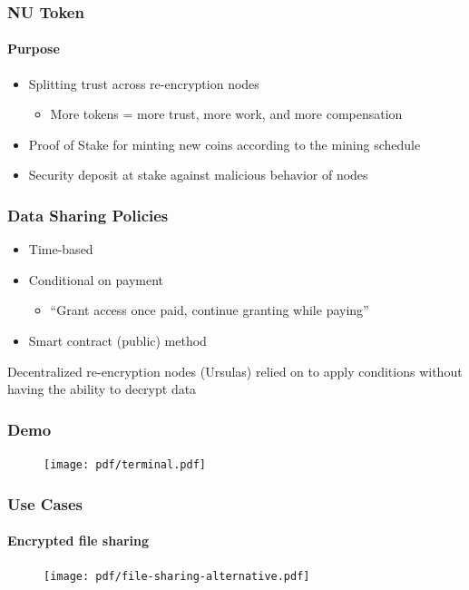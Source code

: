 \documentclass[xetex,mathsans,sans,aspectratio=169]{beamer}
\begin{document}
    \begin{frame}
        \frametitle{NU Token}
        \framesubtitle{Purpose}
        \begin{itemize}
            \setlength\itemsep{1em}
            \item Splitting trust across re-encryption nodes 
            \begin{itemize}
              \item More tokens = more trust, more work, and more compensation
            \end{itemize}
            \item Proof of Stake for minting new coins according to the mining schedule
            \item Security deposit at stake against malicious behavior of nodes
        \end{itemize}
    \end{frame}

   \begin{frame}
        \frametitle{Data Sharing Policies}
        \begin{itemize}
            \setlength\itemsep{1em}
            \item Time-based
            \item Conditional on payment 
            \begin{itemize}
              \item ``Grant access once paid, continue granting while paying''
            \end{itemize}
            \item Smart contract (public) method
        \end{itemize}
        \bigskip
        Decentralized re-encryption nodes (Ursulas) relied on to apply conditions without having the ability to decrypt data
    \end{frame}

    \begin{frame}
        \frametitle{Demo}
        \begin{figure}
            \centering
            \texttt{[image: pdf/terminal.pdf]}
        \end{figure}
    \end{frame}

    \begin{frame}
        \frametitle{Use Cases}
        \framesubtitle{Encrypted file sharing}
        \begin{figure}
            \centering
            \texttt{[image: pdf/file-sharing-alternative.pdf]}
        \end{figure}
    \end{frame}
\end{document}
